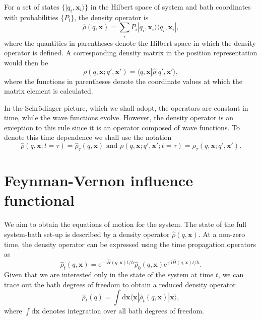 For a set of states $\{|q_i,\bm{x}_i\rangle\}$ in the Hilbert space of system and bath coordinates with probabilities $\{P_i\}$, the density operator is
\begin{equation}
	\hat{\rho}(q,\bm{x}) = \sum_i P_i|q_i,\bm{x}_i\rangle\langle q_i,\bm{x}_i|,
\end{equation}
where the quantities in parentheses denote the Hilbert space in which the density operator is defined. A corresponding density matrix in the position representation would then be
\begin{equation}
	\rho(q,\bm{x};q',\bm{x}') = \langle q,\bm{x}|\hat{\rho}|q',\bm{x}'\rangle,
\end{equation}
where the functions in parentheses denote the coordinate values at which the matrix element is calculated.

In the Schr\"odinger picture, which we shall adopt, the operators are constant in time, while the wave functions evolve. However, the density operator is an exception to this rule since it is an operator composed of wave functions. To denote this time dependence we shall use the notation
\begin{equation}
	\hat{\rho}(q,\bm{x};t=\tau) = \hat{\rho}_\tau(q,\bm{x})\text{ and }
	\rho(q,\bm{x};q',\bm{x}';t=\tau)=\rho_\tau(q,\bm{x};q',\bm{x}').
\end{equation}
\section{Feynman-Vernon influence functional}\label{sec:feynman_vernon_functional}
We aim to obtain the equations of motion for the system. The state of the full system-bath set-up is described by a density operator $\hat{\rho}(q,\bm{x})$. At a non-zero time, the density operator can be expressed using the time propagation operators as%
\begin{equation}
	\hat{\rho}_t(q,\bm{x}) = \mathrm{e}^{-\mathrm{i}\hat{H}(q,\bm{x})t/\hbar} \hat{\rho}_0(q,\bm{x}) \mathrm{e}^{+\mathrm{i}\hat{H}(q,\bm{x})t/\hbar}.
\end{equation}
Given that we are interested only in the state of the system at time $t$, we can trace out the bath degrees of freedom to obtain a reduced density operator
\begin{equation}
	\hat{\rho}_t(q) = \int \mathrm{d}\bm{x}\langle\bm{x}|\hat{\rho}_t(q,\bm{x}) |\bm{x}\rangle,
\end{equation}
where $\int \mathrm{d}\bm{x}$ denotes integration over all bath degrees of freedom.

